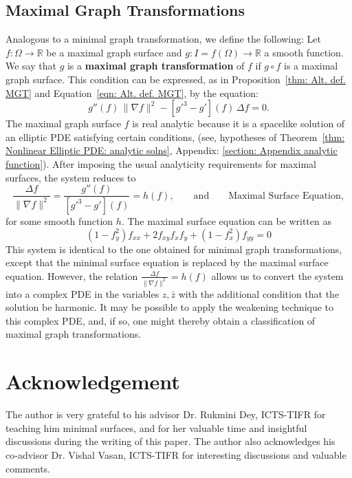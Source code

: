 \documentclass[12pt]{article}
\theoremstyle{plain}
\theoremstyle{definition}
\theoremstyle{remark}
\begin{document}
  \subsection{Maximal Graph Transformations}
   Analogous to a minimal graph transformation, we define the following: Let \(f:\Omega\longrightarrow\mathbb{R}\) be a maximal graph surface and \(g:I=f(\Omega)\longrightarrow\mathbb{R}\) a smooth function. We say that \(g\) is a \textbf{maximal graph transformation} of \(f\) if \(g\circ f\) is a maximal graph surface. This condition can be expressed, as in Proposition~\ref{thm: Alt. def. MGT} and Equation~\ref{eqn: Alt. def. MGT}, by the equation: 
   \[
     g''(f)\,\|\nabla f\|^2-[g'^{3}-g'](f)\,\Delta f=0.
   \]
   The maximal graph surface \(f\) is real analytic because it is a spacelike solution of an elliptic PDE satisfying certain conditions, (see, hypotheses of Theorem~\ref{thm: Nonlinear Elliptic PDE: analytic solns}, Appendix: \ref{section: Appendix analytic function}). After imposing the usual analyticity requirements for maximal surfaces, the system reduces to
   \[
   \frac{\Delta f}{\|\nabla f\|^2}=\frac{g''(f)}{[g'^{3}-g'](f)}=h(f), \qquad\text{and}\qquad \text{Maximal Surface Equation},
   \]
   for some smooth function \(h\). The maximal surface equation can be written as
   \[
     (1 - f_y^2) f_{xx} + 2 f_{xy} f_x f_y + (1 - f_x^2) f_{yy} = 0
   \]   
   This system is identical to the one obtained for minimal graph transformations, except that the minimal surface equation is replaced by the maximal surface equation. However, the relation \(\frac{\Delta f}{\|\nabla f\|^2}=h(f)\) allows us to convert the system into a complex PDE in the variables \(z,\bar z\) with the additional condition that the solution be harmonic. It may be possible to apply the weakening technique to this complex PDE, and, if so, one might thereby obtain a classification of maximal graph transformations.
   
   \section{Acknowledgement}   
   The author is very grateful to his advisor Dr. Rukmini Dey, ICTS-TIFR for teaching him minimal surfaces, and for her valuable time and insightful discussions during the writing of this paper. The author also acknowledges his co‑advisor Dr. Vishal Vasan, ICTS-TIFR for interesting discussions and valuable comments.
   
   \appendix
   
\end{document}
